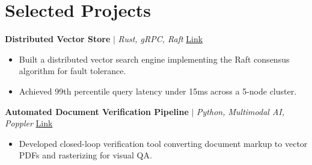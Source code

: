 \documentclass[10pt,letterpaper]{article}
\begin{document}
\section*{Selected Projects}
\textbf{Distributed Vector Store} $|$ \textit{Rust, gRPC, Raft} \hfill \href{https://github.com}{Link}
\begin{itemize}
\item Built a distributed vector search engine implementing the Raft consensus algorithm for fault tolerance.
\item Achieved 99th percentile query latency under 15ms across a 5-node cluster.
\end{itemize}

\textbf{Automated Document Verification Pipeline} $|$ \textit{Python, Multimodal AI, Poppler} \hfill \href{https://github.com}{Link}
\begin{itemize}
\item Developed closed-loop verification tool converting document markup to vector PDFs and rasterizing for visual QA.
\end{itemize}
\end{document}
